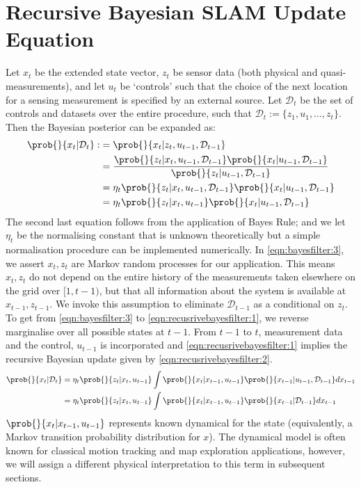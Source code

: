 \section{Recursive Bayesian SLAM Update Equation} \label{sec:appendix1}

	Let $x_t$ be the extended state vector, $z_t$ be sensor data (both physical and quasi-measurements), and let $u_t$ be `controls' such that the choice of the next location for a sensing measurement is specified by an external source. Let $\mathcal{D}_t$ be the set of controls and datasets over the entire procedure, such that $\mathcal{D}_t := \{z_1, u_1, \hdots, z_t \}$. Then the Bayesian posterior can be expanded as:
	\begin{align}
	\prob{}{x_t | \mathcal{D}_t} :&= \prob{}{x_t | z_t, u_{t-1},\mathcal{D}_{t-1}} \\
	&= \frac{\prob{}{z_t | x_t, u_{t-1}, \mathcal{D}_{t-1}} \prob{}{x_t| u_{t-1}, \mathcal{D}_{t-1}} }{\prob{}{ z_t| u_{t-1}, \mathcal{D}_{t-1}}} \label{eqn:bayesfilter:1} \\
	&= \eta_t\prob{}{z_t | x_t, u_{t-1}, \mathcal{D}_{t-1}} \prob{}{x_t| u_{t-1}, \mathcal{D}_{t-1}} \label{eqn:bayesfilter:2} \\
	& = \eta_t\prob{}{z_t | x_t, u_{t-1}} \prob{}{x_t| u_{t-1}, \mathcal{D}_{t-1}} \label{eqn:bayesfilter:3} 
	\end{align} The second last equation follows from the application of Bayes Rule; and we let $\eta_t$ be the normalising constant that is unknown theoretically but a simple normalisation procedure can be implemented numerically. In \cref{eqn:bayesfilter:3}, we assert $x_t, z_t$ are Markov random processes for our application. This means  $x_t, z_t$ do not depend on the entire history of the measurements taken elsewhere on the grid over $[1, t-1)$,  but that all information about the system is available at $x_{t-1}, z_{t-1}$. We invoke this assumption to eliminate $\mathcal{D}_{t-1}$ as a conditional on $z_t$.\\
	To get from \cref{eqn:bayesfilter:3} to  \cref{eqn:recusrivebayesfilter:1}, we reverse marginalise over all possible states at $t-1$. From $t-1$ to $t$, measurement data and the control, $u_{t-1}$ is incorporated and \cref{eqn:recusrivebayesfilter:1} implies the recursive Bayesian update given by \cref{eqn:recusrivebayesfilter:2}. 
	\begin{align}
	\prob{}{x_t | \mathcal{D}_t} &= \eta_t\prob{}{z_t | x_t, u_{t-1}} \int \prob{}{x_t| x_{t-1}, u_{t-1}}  \prob{}{ x_{t-1}| u_{t-1}, \mathcal{D}_{t-1}} dx_{t-1} \label{eqn:recusrivebayesfilter:1} \\
	&= \eta_t\prob{}{z_t | x_t, u_{t-1}} \int \prob{}{x_t| x_{t-1}, u_{t-1}}  \prob{}{ x_{t-1}| \mathcal{D}_{t-1}} dx_{t-1} \label{eqn:recusrivebayesfilter:2}
	\end{align} $\prob{}{x_t| x_{t-1}, u_{t-1}} $ represents known dynamical for the state (equivalently, a Markov transition probability distribution for $x$). The dynamical model is often known for classical motion tracking and map exploration applications, however, we will assign a different physical interpretation to this term in subsequent sections. \\
